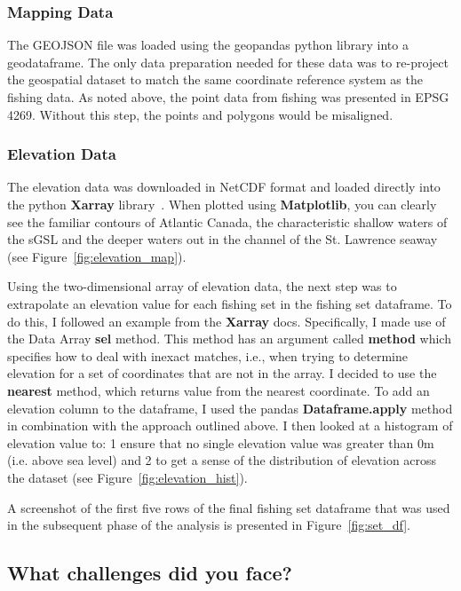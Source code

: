 \subsubsection{Mapping Data}

The GEOJSON file was loaded using the geopandas python library into a geodataframe.
The only data preparation needed for these data was to re-project the geospatial dataset to match the same coordinate reference system as the fishing data.
As noted above, the point data from fishing was presented in EPSG 4269.
Without this step, the points and polygons would be misaligned.

\subsubsection{Elevation Data}

The elevation data was downloaded in NetCDF format and loaded directly into the python \textbf{Xarray} library~\cite{xarray}.
When plotted using \textbf{Matplotlib}, you can clearly see the familiar contours of Atlantic Canada, the characteristic
shallow waters of the sGSL and the deeper waters out in the channel of the St. Lawrence seaway (see Figure~\ref{fig:elevation_map}).

Using the two-dimensional array of elevation data, the next step was to extrapolate an elevation value for each fishing set in the fishing set dataframe.
To do this, I followed an example from the \textbf{Xarray} docs.
Specifically, I made use of the Data Array \textbf{sel} method.
This method has an argument called \textbf{method} which specifies how to deal with inexact matches, i.e.,
when trying to determine elevation for a set of coordinates that are not in the array.
I decided to use the \textbf{nearest} method, which returns value from the nearest coordinate.
To add an elevation column to the dataframe, I used the pandas \textbf{Dataframe.apply} method in combination with the approach outlined above.
I then looked at a histogram of elevation value to: 1\) ensure that no single elevation value was greater than 0m (i.e. above sea level)
and 2\) to get a sense of the distribution of elevation across the dataset (see Figure~\ref{fig:elevation_hist}).

A screenshot of the first five rows of the final fishing set dataframe that was used in the subsequent phase of the analysis is presented in
Figure~\ref{fig:set_df}.

\subsection{What challenges did you face?}


